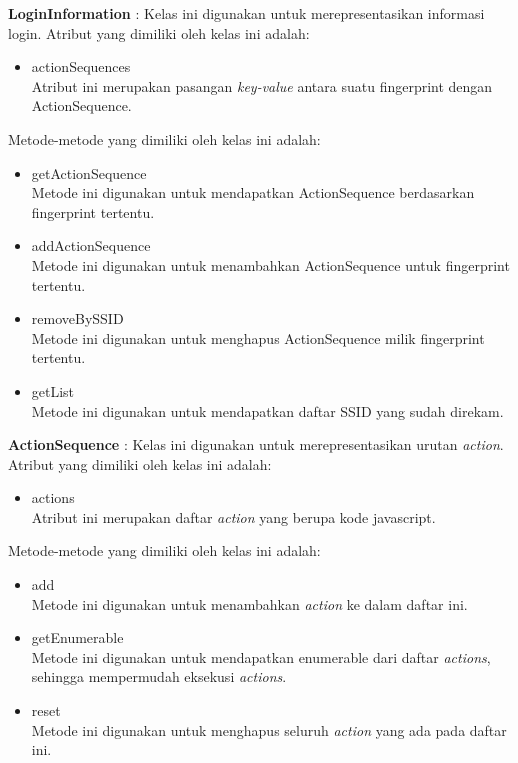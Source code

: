 \documentclass[a4paper,twoside]{article}
\begin{document}
\begin{enumerate}
\begin{itemize}
{                \textbf{LoginInformation} : Kelas ini digunakan untuk merepresentasikan informasi login. Atribut yang dimiliki oleh kelas ini adalah:
                \begin{itemize}
                    \item{actionSequences\\Atribut ini merupakan pasangan \textit{key-value} antara suatu fingerprint dengan ActionSequence.}
                \end{itemize}
                Metode-metode yang dimiliki oleh kelas ini adalah:
                \begin{itemize}
                    \item{getActionSequence\\Metode ini digunakan untuk mendapatkan ActionSequence berdasarkan fingerprint tertentu.}
                    \item{addActionSequence\\Metode ini digunakan untuk menambahkan ActionSequence untuk fingerprint tertentu.}
                    \item{removeBySSID\\Metode ini digunakan untuk menghapus ActionSequence milik fingerprint tertentu.}
                    \item{getList\\Metode ini digunakan untuk mendapatkan daftar SSID yang sudah direkam.}
                \end{itemize}
                
                \textbf{ActionSequence} : Kelas ini digunakan untuk merepresentasikan urutan \textit{action}. Atribut yang dimiliki oleh kelas ini adalah:
                \begin{itemize}
                    \item{actions\\Atribut ini merupakan daftar \textit{action} yang berupa kode javascript.}
                \end{itemize}
                Metode-metode yang dimiliki oleh kelas ini adalah:
                \begin{itemize}
                    \item{add\\Metode ini digunakan untuk menambahkan \textit{action} ke dalam daftar ini.}
                    \item{getEnumerable\\Metode ini digunakan untuk mendapatkan enumerable dari daftar \textit{actions}, sehingga mempermudah eksekusi \textit{actions}.}
                    \item{reset\\Metode ini digunakan untuk menghapus seluruh \textit{action} yang ada pada daftar ini.}
                \end{itemize}
                
}
\end{itemize}
\end{enumerate}
\end{document}
